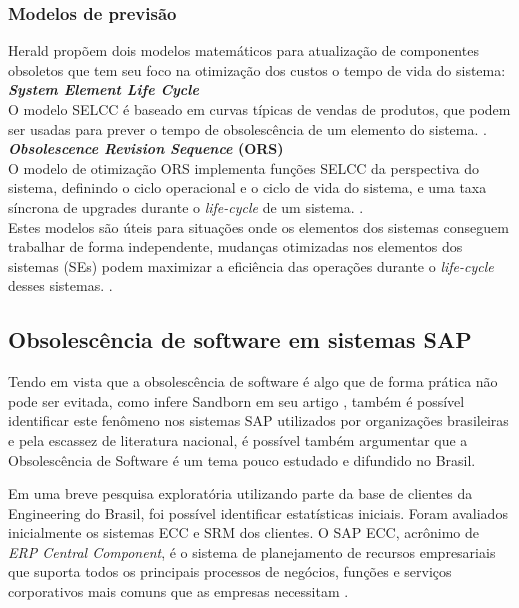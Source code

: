 \subsubsection{\esp Modelos de previsão}

Herald propõem dois modelos matemáticos para atualização de componentes obsoletos que tem seu foco na otimização dos custos o tempo de vida do sistema:\\
\textbf{\textit{System Element Life Cycle}}\\
O modelo SELCC é baseado em curvas típicas de vendas de produtos, que podem ser usadas para prever o tempo de obsolescência de um elemento do sistema.  \cite{herald2012}.\\
\textbf{\textit{Obsolescence Revision Sequence} (ORS)}\\
O modelo de otimização ORS implementa funções SELCC da perspectiva do sistema, definindo o ciclo operacional e o ciclo de vida do sistema, e uma taxa síncrona de upgrades durante o \textit{life-cycle} de um sistema. \cite{herald2012}.\\

Estes modelos são úteis para situações onde os elementos dos sistemas conseguem trabalhar de forma independente, mudanças otimizadas nos elementos dos sistemas (SEs) podem maximizar a eficiência das operações durante o \textit{life-cycle} desses sistemas. \cite{herald2012}.

\subsection{\esp Obsolescência de software em sistemas SAP }

Tendo em vista que a obsolescência de software é algo que de forma prática não pode ser evitada, como infere Sandborn em seu artigo \cite{sandborn2007}, também é possível identificar este fenômeno nos sistemas SAP utilizados por organizações brasileiras e pela escassez de literatura nacional, é possível também argumentar que a Obsolescência de Software é um tema pouco estudado e difundido no Brasil.

Em uma breve pesquisa exploratória utilizando parte da base de clientes da Engineering do Brasil, foi possível identificar estatísticas iniciais. Foram avaliados inicialmente os sistemas ECC e SRM dos clientes.
O SAP ECC, acrônimo de \textit{ERP Central Component}, é o sistema de planejamento de recursos empresariais que suporta todos os principais processos de negócios, funções e serviços corporativos mais comuns que as empresas necessitam  \cite{BOEDER2014}.

